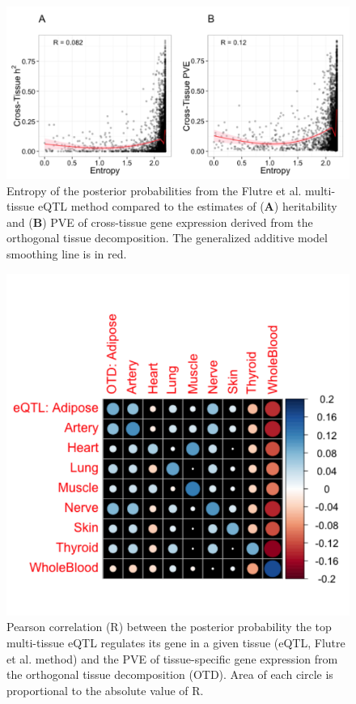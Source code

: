 \documentclass[]{article}
\begin{document}
\begin{figure}[htbp]
\centering
\includegraphics{GenArch_manuscript_files/figure-latex/entropyCT-1.pdf}
\caption{Entropy of the posterior probabilities from the Flutre et al.
multi-tissue eQTL method compared to the estimates of (\textbf{A})
heritability and (\textbf{B}) PVE of cross-tissue gene expression
derived from the orthogonal tissue decomposition. The generalized
additive model smoothing line is in red.}
\end{figure}

\begin{figure}[htbp]
\centering
\includegraphics{GenArch_manuscript_files/figure-latex/corrplot-1.pdf}
\caption{Pearson correlation (R) between the posterior probability the
top multi-tissue eQTL regulates its gene in a given tissue (eQTL, Flutre
et al. method) and the PVE of tissue-specific gene expression from the
orthogonal tissue decomposition (OTD). Area of each circle is
proportional to the absolute value of R.}
\end{figure}
\end{document}
